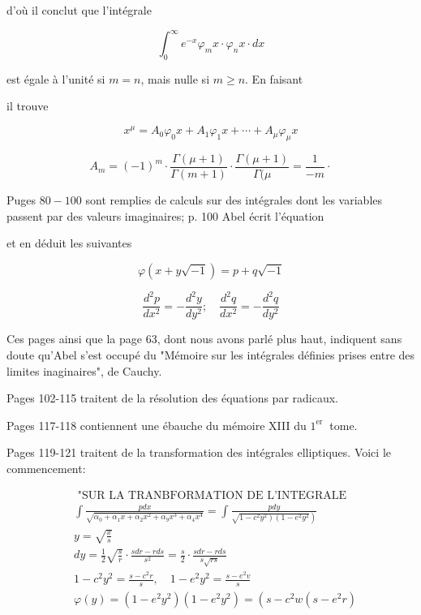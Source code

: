 \documentclass{article}
\begin{document}
d'où il conclut que l'intégrale

\[
\int_{0}^{\infty} e^{-x} \varphi_{m} x \cdot \varphi_{n} x \cdot d x
\]

est égale à l'unité si \(m=n\), mais nulle si \(m \geq n\). En faisant

il trouve

\[
x^{\mu}=A_{0} \varphi_{0} x+A_{1} \varphi_{1} x+\cdots+A_{\mu} \varphi_{\mu} x
\]

\[
A_{m}=(-1)^{m} \cdot \frac{\Gamma(\mu+1)}{\Gamma(m+1)} \cdot \frac{\Gamma(\mu+1)}{\Gamma(\mu}=\frac{1}{-m} \cdot
\]

Puges \(80-100\) sont remplies de calculs sur des intégrales dont les variables passent par des valeurs imaginaires; p. 100 Abel écrit l'équation

et en déduit les suivantes

\[
\varphi(x+y \sqrt{-1})=p+q \sqrt{-1}
\]

\[
\frac{d^{2} p}{d x^{2}}=-\frac{d^{2} y}{d y^{2}} ; \quad \frac{d^{2} q}{d x^{2}}=-\frac{d^{2} q}{d y^{2}}
\]

Ces pages ainsi que la page 63, dont nous avons parlé plus haut, indiquent sans doute qu'Abel s'est occupé du "Mémoire sur les intégrales définies prises entre des limites inaginaires", de Cauchy.

Pages 102-115 traitent de la résolution des équations par radicaux.

Pages 117-118 contiennent une ébauche du mémoire XIII du \(1^{\text {er }}\) tome.

Pages 119-121 traitent de la transformation des intégrales elliptiques. Voici le commencement:

\[
\begin{aligned}
& \text { "SUR LA TRANBFORMATION DE L'INTEGRALE } \\
& \int \frac{p d x}{\sqrt{\alpha_{0}+\alpha_{1} x+\alpha_{2} x^{2}+\alpha_{9} x^{3}+\alpha_{4} x^{4}}}=\int \frac{p d y}{\left.\sqrt{\left.1-c^{2} y^{2}\right)\left(1-e^{2} y^{2}\right.}\right)} \\
& y=\sqrt{\frac{x}{s}} \\
& d y=\frac{1}{2} \sqrt{\frac{s}{r}} \cdot \frac{s d r-r d s}{s^{2}}=\frac{s}{2} \cdot \frac{s d r-r d s}{s \sqrt{r s}} \\
& 1-c^{2} y^{2}=\frac{s-c^{2} r}{s}, \quad 1-e^{2} y^{2}=\frac{s-e^{2} v}{s} \\
& \varphi(y)=\left(1-e^{2} y^{2}\right)\left(1-e^{2} y^{2}\right)=\left(s-c^{2} w\left(s-e^{2} r\right)\right.
\end{aligned}
\]
\end{document}
